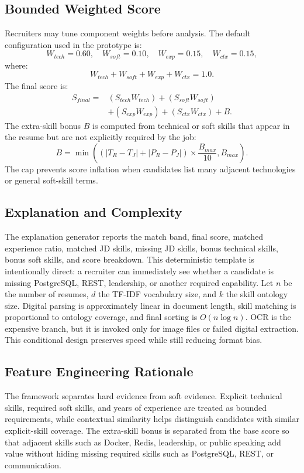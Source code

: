 \subsection{Bounded Weighted Score}
Recruiters may tune component weights before analysis. The default configuration used in the prototype is:
\begin{equation}
W_{tech}=0.60,\quad W_{soft}=0.10,\quad W_{exp}=0.15,\quad W_{ctx}=0.15,
\end{equation}
where:
\begin{equation}
W_{tech}+W_{soft}+W_{exp}+W_{ctx}=1.0.
\end{equation}
The final score is:
\begin{equation}
\begin{split}
S_{final}={}&(S_{tech}W_{tech})+(S_{soft}W_{soft})\\
&+(S_{exp}W_{exp})+(S_{ctx}W_{ctx})+B.
\end{split}
\end{equation}
The extra-skill bonus \(B\) is computed from technical or soft skills that appear in the resume but are not explicitly required by the job:
\begin{equation}
B=\min\left((|T_R-T_J|+|P_R-P_J|)\times \frac{B_{max}}{10},B_{max}\right).
\end{equation}
The cap prevents score inflation when candidates list many adjacent technologies or general soft-skill terms.

\subsection{Explanation and Complexity}
The explanation generator reports the match band, final score, matched experience ratio, matched JD skills, missing JD skills, bonus technical skills, bonus soft skills, and score breakdown. This deterministic template is intentionally direct: a recruiter can immediately see whether a candidate is missing PostgreSQL, REST, leadership, or another required capability. Let \(n\) be the number of resumes, \(d\) the TF-IDF vocabulary size, and \(k\) the skill ontology size. Digital parsing is approximately linear in document length, skill matching is proportional to ontology coverage, and final sorting is \(O(n\log n)\). OCR is the expensive branch, but it is invoked only for image files or failed digital extraction. This conditional design preserves speed while still reducing format bias.

\subsection{Feature Engineering Rationale}
The framework separates hard evidence from soft evidence. Explicit technical skills, required soft skills, and years of experience are treated as bounded requirements, while contextual similarity helps distinguish candidates with similar explicit-skill coverage. The extra-skill bonus is separated from the base score so that adjacent skills such as Docker, Redis, leadership, or public speaking add value without hiding missing required skills such as PostgreSQL, REST, or communication.
